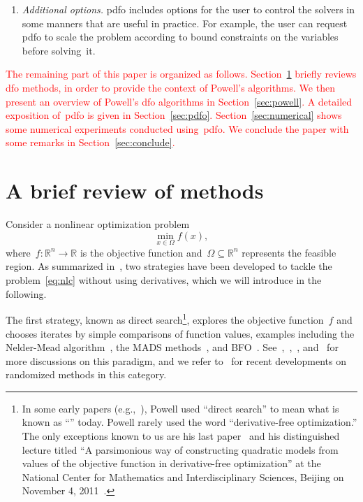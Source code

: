 \documentclass[
    smallextended,  %
    draft,          %
]{svjour3}
\newcommand{\R}{\mathbb{R}}
\newcommand{\fset}{\Omega}
\newcommand{\obj}{f}
\newcommand{\red}{\textcolor{red}}
\begin{document}
\begin{enumerate}
    \item \emph{Additional options.}
    \Gls{pdfo} includes options for the user to control the solvers in some manners that are useful in practice.
    For example, the user can request \gls{pdfo} to scale the problem according to bound constraints on the variables before solving~it.
\end{enumerate}

\red{
The remaining part of this paper is organized as follows.
Section~\ref{sec:dfo} briefly reviews \gls{dfo} methods, in order to provide the context of Powell's algorithms.
We then present an overview of Powell's \gls{dfo} algorithms in Section~\ref{sec:powell}.
A detailed exposition of~\gls{pdfo} is given in Section~\ref{sec:pdfo}.
Section~\ref{sec:numerical} shows some numerical experiments conducted using~\gls{pdfo}.
We conclude the paper with some remarks in Section~\ref{sec:conclude}.
}

\section{A brief review of  methods}
\label{sec:dfo}

Consider a nonlinear optimization problem
\begin{equation}
    \label{eq:nlc}
    \min_{x \in \fset} \obj(x),
\end{equation}
where~$\obj : \R^n \to \R$ is the objective function and~$\fset \subseteq \R^n$ represents the feasible region.
As summarized in~\cite{Conn_Scheinberg_Vicente_2009b}, two strategies have been developed to tackle
the problem~\eqref{eq:nlc} without using derivatives, which we will introduce in the following.

The first strategy, known as direct search\footnote{In some early papers (e.g.,~\cite{Powell_1994,Powell_1998}), Powell used ``direct search'' to mean what is known as ``'' today. Powell rarely used the word ``derivative-free optimization.''
The only exceptions known to us are his last paper~\cite{Powell_2015} and his distinguished lecture
titled ``A parsimonious way of constructing quadratic models from values of the objective function in
derivative-free optimization'' at the National Center for Mathematics and Interdisciplinary Sciences,
Beijing on November 4, 2011~\cite{Buhmann_Fletcher_Iserles_Toint_2018}.}, explores the objective function~$\obj$ and chooses iterates by simple comparisons of function values, examples including the Nelder-Mead algorithm~\cite{Nelder_Mead_1965}, the MADS methods~\cite{Audet_Dennis_2006,Abramson_Audet_2006,Digabel_2011}, and BFO~\cite{Porcelli_Toint_2017,Porcelli_Toint_2020,Porcelli_Toint_2022}.
See~\cite{Kolda_Lewis_Torczon_2003},~\cite[Chapters~7 and~8]{Conn_Scheinberg_Vicente_2009b},~\cite[Part~3]{Audet_Hare_2017}, and~\cite[\S~2.1]{Larson_Menickelly_Wild_2019} for more discussions on this paradigm, and we refer to~\cite{Gratton_Etal_2015,Gratton_Etal_2019} for recent developments on randomized methods in this category.
\end{document}
